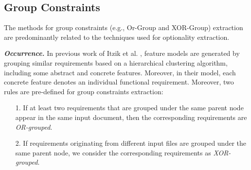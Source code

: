 \documentclass[graybox]{svmult}
\begin{document}



\subsection{Group Constraints}
The methods for group constraints (e.g., Or-Group and XOR-Group) extraction are predominantly related to the techniques used for optionality extraction.

\textit{\textbf{Occurrence.}} In previous work of Itzik et al. \cite{ItzikR14}, feature models are generated by grouping similar requirements based on a hierarchical clustering algorithm, including some abstract and concrete features. 
Moreover, in their model, each concrete feature denotes an individual functional requirement. Moreover, two rules are pre-defined for group constraints extraction:


\vspace{2mm}
\begin{mdframed}[style=mystyle]
\begin{itemize}
    \item [1.] If at least two requirements that are grouped under the same parent node appear in the same input document, then the corresponding requirements are \textit{OR-grouped}.
    \item [2.] If requirements originating from different input files are grouped under the same parent node, we consider the corresponding requirements as \textit{XOR-grouped}.
\end{itemize} 
\end{mdframed}
\vspace{4mm}
\end{document}
